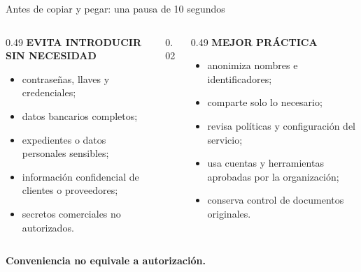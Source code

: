 \documentclass[aspectratio=169,11pt]{beamer}
\newcommand{\kicker}[1]{{\color{gold}\scriptsize\bfseries\MakeUppercase{#1}}}
\begin{document}
\begin{frame}{Antes de copiar y pegar: una pausa de 10 segundos}
\begin{columns}[T,onlytextwidth]
\begin{column}{0.49\textwidth}
\kicker{Evita introducir sin necesidad}\par\vspace{0.20cm}
\small
\begin{itemize}
\item contraseñas, llaves y credenciales;
\item datos bancarios completos;
\item expedientes o datos personales sensibles;
\item información confidencial de clientes o proveedores;
\item secretos comerciales no autorizados.
\end{itemize}
\end{column}
\begin{column}{0.02\textwidth}
\centering{\color{soft}\rule{0.6pt}{5.0cm}}
\end{column}
\begin{column}{0.49\textwidth}
\kicker{Mejor práctica}\par\vspace{0.20cm}
\small
\begin{itemize}
\item anonimiza nombres e identificadores;
\item comparte solo lo necesario;
\item revisa políticas y configuración del servicio;
\item usa cuentas y herramientas aprobadas por la organización;
\item conserva control de documentos originales.
\end{itemize}
\end{column}
\end{columns}

\vfill
{\color{rust}\bfseries Conveniencia no equivale a autorización.}
\end{frame}
\end{document}
